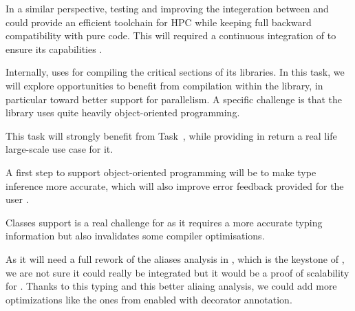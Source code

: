 \begin{workpackage}[id=hpc,wphases=36-48,
  title=High Performance Computing,
  PSRM=1, %
  LLRM=12, %
  SARM=1, %
  UKRM=1, %
  UBRM=1, %
  UJFRM=12]
\begin{tasklist}
\begin{task}[title=\Pythran for \Sage and \Sage Users,id=pythran_sage]
  In a similar perspective, testing and improving the integeration between
   and \Pythran could provide an efficient toolchain for HPC
  while keeping full backward compatibility with pure \Python code. This will
  required a continuous integration of \Pythran to ensure its capabilities
  .

  Internally, \Sage uses \Cython for compiling the critical sections of
  its libraries. In this task, we will explore opportunities to
  benefit from \Pythran compilation within the \Sage library, in
  particular toward better support for parallelism. A specific
  challenge is that the \Sage library uses quite heavily
  object-oriented programming.

  This task will strongly benefit from Task~,
  while providing in return a real life large-scale use case for it.

  A first step to support object-oriented programming will be to make
  \Pythran type inference more accurate, which will also improve error
  feedback provided for the user .
\end{task}

\begin{task}[title=Explorative task: Add support for classes in \Pythran.]
  Classes support is a real challenge for \Pythran as it requires a more
  accurate typing information but also invalidates some compiler optimisations.

  As it will need a full rework of the aliases analysis in \Pythran, which is
  the keystone of \Pythran, we are not sure it could really
  be integrated but it would be a proof of scalability for \Pythran.
  Thanks to this typing and this better aliaing analysis, we could add more
  optimizations like the ones from \Cython enabled with decorator annotation.
\end{task}
\end{tasklist}


\end{workpackage}
